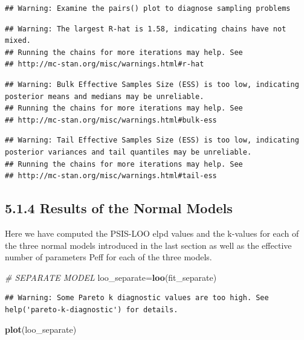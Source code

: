 \documentclass[]{article}
\newenvironment{Shaded}{\begin{snugshade}}{\end{snugshade}}
\newcommand{\KeywordTok}[1]{\textcolor[rgb]{0.13,0.29,0.53}{\textbf{#1}}}
\newcommand{\CommentTok}[1]{\textcolor[rgb]{0.56,0.35,0.01}{\textit{#1}}}
\newcommand{\NormalTok}[1]{#1}
\begin{document}
\begin{verbatim}
## Warning: Examine the pairs() plot to diagnose sampling problems
\end{verbatim}

\begin{verbatim}
## Warning: The largest R-hat is 1.58, indicating chains have not mixed.
## Running the chains for more iterations may help. See
## http://mc-stan.org/misc/warnings.html#r-hat
\end{verbatim}

\begin{verbatim}
## Warning: Bulk Effective Samples Size (ESS) is too low, indicating posterior means and medians may be unreliable.
## Running the chains for more iterations may help. See
## http://mc-stan.org/misc/warnings.html#bulk-ess
\end{verbatim}

\begin{verbatim}
## Warning: Tail Effective Samples Size (ESS) is too low, indicating posterior variances and tail quantiles may be unreliable.
## Running the chains for more iterations may help. See
## http://mc-stan.org/misc/warnings.html#tail-ess
\end{verbatim}

\subsection{5.1.4 Results of the Normal
Models}\label{results-of-the-normal-models}

Here we have computed the PSIS-LOO elpd values and the k-values for each
of the three normal models introduced in the last section as well as the
effective number of parameters Peff for each of the three models.

\begin{Shaded}
\begin{Highlighting}[]
\CommentTok{# SEPARATE MODEL}
\NormalTok{loo_separate=}\KeywordTok{loo}\NormalTok{(fit_separate)}
\end{Highlighting}
\end{Shaded}

\begin{verbatim}
## Warning: Some Pareto k diagnostic values are too high. See help('pareto-k-diagnostic') for details.
\end{verbatim}

\begin{Shaded}
\begin{Highlighting}[]
\KeywordTok{plot}\NormalTok{(loo_separate)}
\end{Highlighting}
\end{Shaded}
\end{document}
